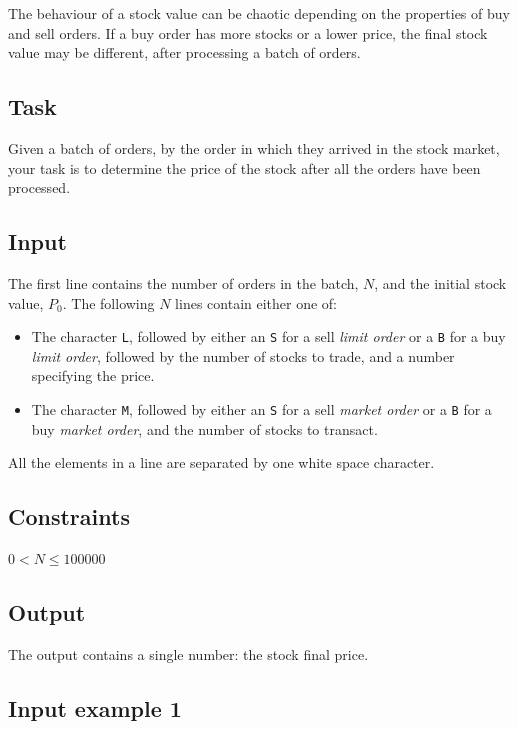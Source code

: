 \documentclass[11pt]{report}
\begin{document}
The behaviour of a stock value can be chaotic depending on the
properties of buy and sell orders. If a buy order has more stocks or a
lower price, the final stock value may be different, after processing
a batch of orders.

\subsection*{Task}

Given a batch of orders, by the order in which they arrived in the
stock market, your task is to determine the price of the stock after
all the orders have been processed.


\subsection*{Input}

The first line contains the number of orders in the batch, $N$, and
the initial stock value, $P_0$. The following $N$ lines contain either
one of:
\begin{itemize}
\item The character \verb|L|, followed by either an \verb|S| for a
  sell \emph{limit order} or a \verb|B| for a buy \emph{limit order},
  followed by the number of stocks to trade, and a number specifying
  the price.
\item The character \verb|M|, followed by either an \verb|S| for a
  sell \emph{market order} or a \verb|B| for a buy \emph{market
    order}, and the number of stocks to transact.
\end{itemize}
All the elements in a line are separated by one white space character.

\subsection*{Constraints}

$0 < N \le 100000$

\subsection*{Output}

The output contains a single number: the stock final price.

\subsection*{Input example 1}
\end{document}
